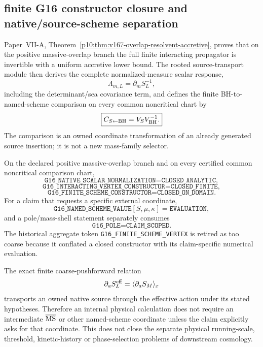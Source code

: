 \documentclass[12pt,a4paper]{article}
\begin{document}

\subsection{finite G16 constructor closure and native/source-scheme separation}
\label{p12:sec:v293-g16-finite-constructor-closure}

Paper~VII-A, Theorem~\ref{p10:thm:v167-overlap-resolvent-accretive}, proves that
on the positive massive-overlap branch the full finite interacting propagator
is invertible with a uniform accretive lower bound.  The rooted source-transport
module then derives the complete normalized-measure scalar response,
\[
 \Lambda_{m,L}=\partial_mS_L^{-1},
\]
including the determinant/sea covariance term, and defines the finite
BH-to-named-scheme comparison on every common noncritical chart by
\[
 \boxed{
 C_{S\leftarrow{\rm BH}}
 =V_SV_{\rm BH}^{-1}.}
\]
The comparison is an owned coordinate transformation of an already generated
source insertion; it is not a new mass-family selector.

\begin{theorem}
\label{p12:thm:v293-g16-structural-status}
On the declared positive massive-overlap branch and on every certified common
noncritical comparison chart,
\[
 \boxed{\texttt{G16\_NATIVE\_SCALAR\_NORMALIZATION=CLOSED\_ANALYTIC}},
\]
\[
 \boxed{\texttt{G16\_INTERACTING\_VERTEX\_CONSTRUCTOR=CLOSED\_FINITE}},
\]
\[
 \boxed{\texttt{G16\_FINITE\_SCHEME\_CONSTRUCTOR=CLOSED\_ON\_DOMAIN}}.
\]
For a claim that requests a specific external coordinate,
\[
 \boxed{\texttt{G16\_NAMED\_SCHEME\_VALUE}[S,\mu,\kappa]=\texttt{EVALUATION}},
\]
and a pole/mass-shell statement separately consumes
\[
 \boxed{\texttt{G16\_POLE=CLAIM\_SCOPED}}.
\]
The historical aggregate token
\texttt{G16\_FINITE\_SCHEME\_VERTEX} is retired as too coarse because it
conflated a closed constructor with its claim-specific numerical evaluation.
\end{theorem}

\begin{corollary}
\label{p12:cor:v293-native-source-evolution-bypasses-scheme}
The exact finite coarse-pushforward relation
\[
 \partial_aS_L^{\rm eff}=\langle\partial_aS_M\rangle_x
\]
transports an owned native source through the effective action under its stated
hypotheses.  Therefore an internal physical calculation does not require an
intermediate $\overline{\rm MS}$ or other named-scheme coordinate unless the
claim explicitly asks for that coordinate.  This does not close the separate
physical running-scale, threshold, kinetic-history or phase-selection problems
of downstream cosmology.
\end{corollary}
\end{document}
